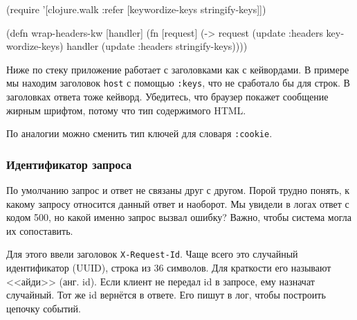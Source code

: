 
\begin{english}
  \begin{clojure}
(require '[clojure.walk :refer
           [keywordize-keys stringify-keys]])

(defn wrap-headers-kw [handler]
  (fn [request]
    (-> request
        (update :headers keywordize-keys)
        handler
        (update :headers stringify-keys))))
  \end{clojure}
\end{english}

Ниже по стеку приложение работает с заголовками как с кейвордами. В примере мы
находим заголовок \verb|host| с помощью \verb|:keys|, что не сработало бы
для строк. В заголовках ответа тоже кейворд. Убедитесь, что браузер покажет
сообщение жирным шрифтом, потому что тип содержимого HTML.

\begin{english}
\end{english}

\noindent
По аналогии можно сменить тип ключей для словаря \verb|:cookie|.

\subsubsection*{Идентификатор запроса}


По умолчанию запрос и ответ не связаны друг с другом. Порой трудно понять, к
какому запросу относится данный ответ и наоборот. Мы увидели в логах ответ с
кодом 500, но какой именно запрос вызвал ошибку? Важно, чтобы система могла их
сопоставить.

Для этого ввели заголовок \verb|X-Request-Id|. Чаще всего это случайный
идентификатор (UUID), строка из 36 символов. Для краткости его называют <<айди>>
(анг. id). Если клиент не передал id в запросе, ему назначат случайный. Тот же
id вернётся в ответе. Его пишут в лог, чтобы построить цепочку событий.

